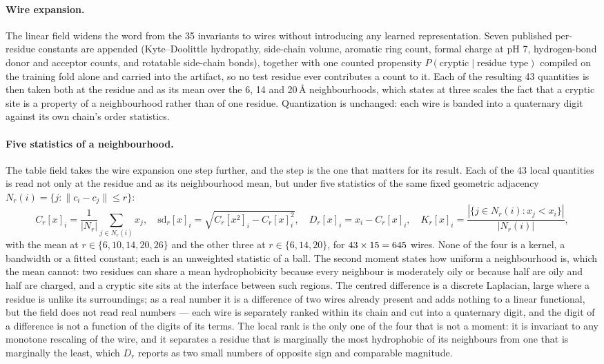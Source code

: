 \documentclass[11pt]{article}
\begin{document}
\paragraph{Wire expansion.} The linear field widens the word from the 35
invariants to \NLinWires{} wires without introducing any learned representation.
Seven published per-residue constants are appended (Kyte--Doolittle hydropathy,
side-chain volume, aromatic ring count, formal charge at pH 7, hydrogen-bond
donor and acceptor counts, and rotatable side-chain bonds), together with one
counted propensity \(P(\text{cryptic}\mid\text{residue type})\) compiled on the
training fold alone and carried into the artifact, so no test residue ever
contributes a count to it. Each of the resulting 43 quantities is then taken both
at the residue and as its mean over the 6, 14 and 20\,\AA{} neighbourhoods, which
states at three scales the fact that a cryptic site is a property of a
neighbourhood rather than of one residue. Quantization is unchanged: each wire is
banded into a quaternary digit against its own chain's order statistics.

\paragraph{Five statistics of a neighbourhood.} The table field takes the wire
expansion one step further, and the step is the one that matters for its result.
Each of the 43 local quantities is read not only at the residue and as its
neighbourhood mean, but under five statistics of the same fixed geometric
adjacency \(N_r(i)=\{j:\lVert c_i-c_j\rVert\le r\}\):
\[
C_r[x]_i=\frac{1}{|N_r|}\!\!\sum_{j\in N_r(i)}\!\! x_j,\quad
\mathrm{sd}_r[x]_i=\sqrt{C_r[x^2]_i-C_r[x]_i^2},\quad
D_r[x]_i=x_i-C_r[x]_i,\quad
K_r[x]_i=\frac{|\{j\in N_r(i):x_j<x_i\}|}{|N_r(i)|},
\]
with the mean at \(r\in\{6,10,14,20,26\}\) and the other three at
\(r\in\{6,14,20\}\), for \(43\times 15=645{}\) wires. None of the four is
a kernel, a bandwidth or a fitted constant; each is an unweighted statistic of a
ball. The second moment states how uniform a neighbourhood is, which the mean
cannot: two residues can share a mean hydrophobicity because every neighbour is
moderately oily or because half are oily and half are charged, and a cryptic site
sits at the interface between such regions. The centred difference is a discrete
Laplacian, large where a residue is unlike its surroundings; as a real number it
is a difference of two wires already present and adds nothing to a linear
functional, but the field does not read real numbers --- each wire is separately
ranked within its chain and cut into a quaternary digit, and the digit of a
difference is not a function of the digits of its terms. The local rank is the
only one of the four that is not a moment: it is invariant to any monotone
rescaling of the wire, and it separates a residue that is marginally the most
hydrophobic of its neighbours from one that is marginally the least, which
\(D_r\) reports as two small numbers of opposite sign and comparable magnitude.
\end{document}
